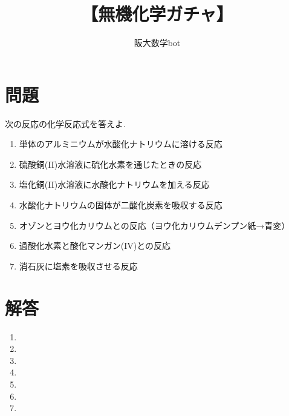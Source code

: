 \documentclass[10pt]{ltjarticle}
\title{【無機化学ガチャ】}
\date{\empty}
\author{阪大数学bot}
\begin{document}
\maketitle

\section*{問題}
次の反応の化学反応式を答えよ.

\begin{enumerate}[label=\textbf{\fbox{\arabic*}}]
  \item 単体のアルミニウムが水酸化ナトリウムに溶ける反応
  \item 硫酸銅(II)水溶液に硫化水素を通じたときの反応
  \item 塩化銅(II)水溶液に水酸化ナトリウムを加える反応
  \item 水酸化ナトリウムの固体が二酸化炭素を吸収する反応
  \item オゾンとヨウ化カリウムとの反応（ヨウ化カリウムデンプン紙→青変）
  \item 過酸化水素と酸化マンガン(IV)との反応
  \item 消石灰に塩素を吸収させる反応
\end{enumerate}

\newpage
\section*{解答}
\begin{enumerate}[label=\textbf{\fbox{\arabic*}}]
  \item {}
  \item {}
  \item {}
  \item {}
  \item {}
  \item {}
  \item {}
\end{enumerate}
\end{document}
